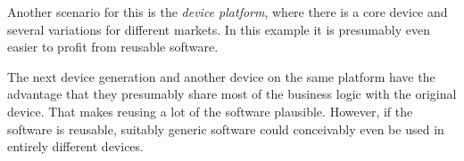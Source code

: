 Another scenario for this is the \textit{device platform}, where there is a core device and several variations for different markets. In this example it is presumably even easier to profit from reusable software.

The next device generation and another device on the same platform have the advantage that they presumably share most of the business logic with the original device. That makes reusing a lot of the software plausible. However, if the software is reusable, suitably generic software could conceivably even be used in entirely different devices.
